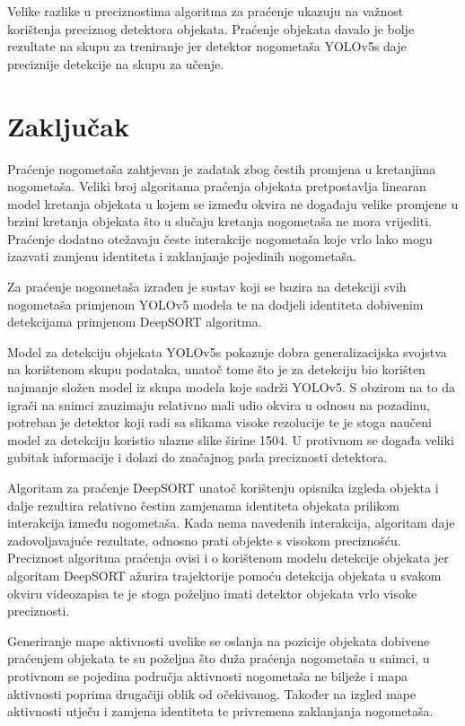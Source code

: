 \documentclass[times, utf8, seminar, numeric]{fer}
\begin{document}
Velike razlike u preciznostima algoritma za praćenje ukazuju na važnost korištenja preciznog detektora objekata. Praćenje objekata davalo je bolje rezultate na skupu za treniranje jer detektor nogometaša YOLOv5s daje preciznije detekcije na skupu za učenje. 

\chapter{Zaključak}




Praćenje nogometaša zahtjevan je zadatak zbog čestih promjena u kretanjima nogometaša. Veliki broj algoritama praćenja objekata pretpostavlja linearan model kretanja objekata u kojem se između okvira ne događaju velike promjene u brzini kretanja objekata što u slučaju kretanja nogometaša ne mora vrijediti. Praćenje dodatno otežavaju česte interakcije nogometaša koje vrlo lako mogu izazvati zamjenu identiteta i zaklanjanje pojedinih nogometaša. 

Za praćenje nogometaša izrađen je sustav koji se bazira na detekciji svih nogometaša primjenom YOLOv5 modela te na dodjeli identiteta dobivenim detekcijama primjenom DeepSORT algoritma. 

Model za detekciju objekata YOLOv5s pokazuje dobra generalizacijska svojstva na korištenom skupu podataka, unatoč tome što je za detekciju bio korišten najmanje složen model iz skupa modela koje sadrži YOLOv5. S obzirom na to da igrači na snimci zauzimaju relativno mali udio okvira u odnosu na pozadinu, potreban je detektor koji radi sa slikama visoke rezolucije te je stoga naučeni model za detekciju koristio ulazne slike širine 1504. U protivnom se događa veliki gubitak informacije i dolazi do značajnog pada preciznosti detektora. 

Algoritam za praćenje DeepSORT unatoč korištenju opisnika izgleda objekta i dalje rezultira relativno čestim zamjenama identiteta objekata prilikom interakcija između nogometaša. Kada nema navedenih interakcija, algoritam daje zadovoljavajuće rezultate, odnosno prati objekte s visokom preciznošću. Preciznost algoritma praćenja ovisi i o korištenom modelu detekcije objekata jer algoritam DeepSORT ažurira trajektorije pomoću detekcija objekata u svakom okviru videozapisa te je stoga poželjno imati detektor objekata vrlo visoke preciznosti. 

Generiranje mape aktivnosti uvelike se oslanja na pozicije objekata dobivene praćenjem objekata te su poželjna što duža praćenja nogometaša u snimci, u protivnom se pojedina područja aktivnosti nogometaša ne bilježe i mapa aktivnosti poprima drugačiji oblik od očekivanog. Također na izgled mape aktivnosti utječu i zamjena identiteta te privremena zaklanjanja nogometaša.
\end{document}
